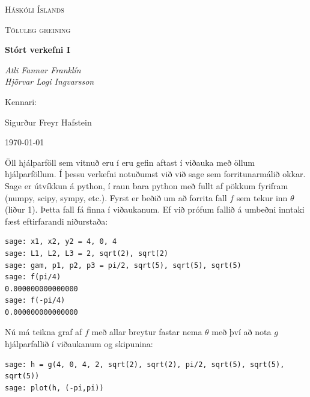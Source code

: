 \documentclass{article}
\begin{document}
\begin{titlepage}
	\centering
	{\scshape\LARGE Háskóli Íslands \par}
	\vspace{1cm}
	{\scshape\Large Töluleg greining \par}
	\vspace{1.5cm}
	{\huge\bfseries Stórt verkefni I \par}
	\vspace{2cm}
	{\Large\itshape Atli Fannar Franklín \\ Hjörvar Logi Ingvarsson\par}
	\vfill
	Kennari: \par
	Sigurður Freyr Hafstein \par 

	\vfill

	{\large \today\par}
\end{titlepage}

Öll hjálparföll sem vitnuð eru í eru gefin aftast í viðauka með öllum hjálparföllum. Í þessu verkefni notuðumst við við sage sem forritunarmálið okkar. Sage er útvíkkun á python, í raun bara python með fullt af pökkum fyrifram (numpy, scipy, sympy, etc.). Fyrst er beðið um að forrita fall $f$ sem tekur inn $\theta$ (liður 1). Þetta fall fá finna í viðaukanum. Ef við prófum fallið á umbeðni inntaki fæst eftirfarandi niðurstaða: \\

\begin{verbatim}
sage: x1, x2, y2 = 4, 0, 4
sage: L1, L2, L3 = 2, sqrt(2), sqrt(2)
sage: gam, p1, p2, p3 = pi/2, sqrt(5), sqrt(5), sqrt(5)
sage: f(pi/4)
0.000000000000000
sage: f(-pi/4)
0.000000000000000
\end{verbatim}

\vspace*{0.5cm}

Nú má teikna graf af $f$ með allar breytur fastar nema $\theta$ með því að nota $g$ hjálparfallið í viðaukanum og skipunina: \\

\begin{small}
\begin{verbatim}
sage: h = g(4, 0, 4, 2, sqrt(2), sqrt(2), pi/2, sqrt(5), sqrt(5), sqrt(5))
sage: plot(h, (-pi,pi))
\end{verbatim}
\end{small}

\vspace*{0.5cm}
\end{document}
